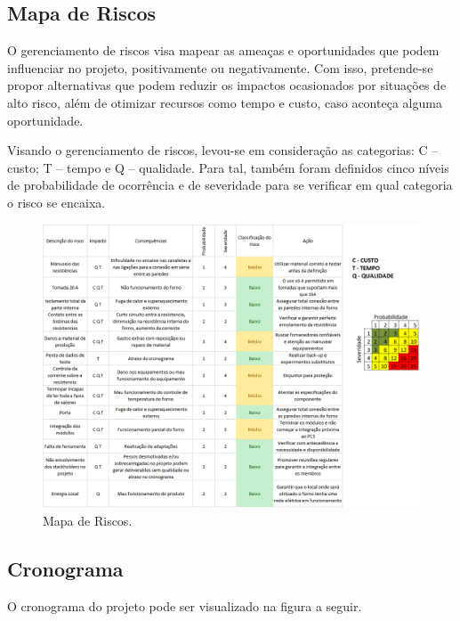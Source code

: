 \subsection{Mapa de Riscos}

O gerenciamento de riscos visa mapear as ameaças e oportunidades que podem influenciar no projeto, positivamente ou negativamente. Com isso, pretende-se propor alternativas que podem reduzir os impactos ocasionados por situações de alto risco, além de otimizar recursos como tempo e custo, caso aconteça alguma oportunidade.

Visando o gerenciamento de riscos, levou-se em consideração as categorias: C – custo; T – tempo e Q – qualidade. Para tal, também foram definidos cinco níveis de probabilidade de ocorrência e de severidade para se verificar em qual categoria o risco se encaixa.

\begin{figure}[!ht]
	\centering
	\label{risco2}
	\includegraphics[keepaspectratio=true,scale=0.8]{figuras/riscos.png}
	\caption{Mapa de Riscos.}
\end{figure}

\subsection{Cronograma}

O cronograma do projeto pode ser visualizado na figura a seguir.

